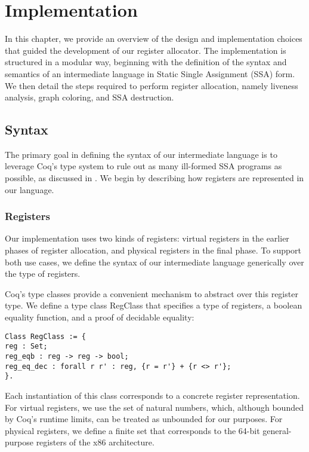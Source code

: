 
\chapter{Implementation}
\label{cha:implementation}

In this chapter, we provide an overview of the design and implementation choices that guided the development of our register allocator. The implementation is structured in a modular way, beginning with the definition of the syntax and semantics of an intermediate language in Static Single Assignment (SSA) form. We then detail the steps required to perform register allocation, namely liveness analysis, graph coloring, and SSA destruction.

\section{Syntax}
\label{sec:syntax}

The primary goal in defining the syntax of our intermediate language is to leverage Coq’s type system to rule out as many ill-formed SSA programs as possible, as discussed in . We begin by describing how registers are represented in our language.

\subsection{Registers}

Our implementation uses two kinds of registers: virtual registers in the earlier phases of register allocation, and physical registers in the final phase. To support both use cases, we define the syntax of our intermediate language generically over the type of registers.

Coq’s type classes provide a convenient mechanism to abstract over this register type. We define a type class RegClass that specifies a type of registers, a boolean equality function, and a proof of decidable equality:

\begin{lstlisting}[language=Coq]
Class RegClass := {
reg : Set;
reg_eqb : reg -> reg -> bool;
reg_eq_dec : forall r r' : reg, {r = r'} + {r <> r'};
}.
\end{lstlisting}

Each instantiation of this class corresponds to a concrete register representation. For virtual registers, we use the set of natural numbers, which, although bounded by Coq's runtime limits, can be treated as unbounded for our purposes. For physical registers, we define a finite set that corresponds to the 64-bit general-purpose registers of the x86 architecture.


